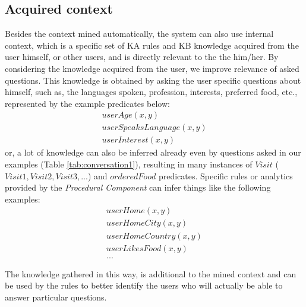 \subsection{Acquired context}
\label{section:acquiredContext}
Besides the context mined automatically, the system can also use internal 
context, which is a specific set of KA rules and KB knowledge acquired from
the user himself, or other users, and is directly relevant to the the him/her. 
By considering the knowledge acquired from the user, we improve relevance of 
asked questions. 
This knowledge is obtained by asking the user specific questions about himself,
such as, the languages spoken, profession, interests, preferred food, etc.,
represented by the example predicates below:
\begin{equation*}
\begin{gathered}
	userAge(x,y) \\	
	userSpeaksLanguage(x,y) \\
	userInterest(x,y)
\end{gathered}
\end{equation*}
or, a lot of knowledge can also be inferred already even by questions asked
in our examples (Table \ref{tab:conversation1}), resulting in many instances of
$Visit$ ($Visit1,Visit2,Visit3,...$) and $orderedFood$ predicates.
Specific rules or analytics provided by the \emph{Procedural Component} can
infer things like the following examples:
\begin{equation*}
\begin{gathered}
	userHome(x,y) \\
	userHomeCity(x,y) \\
	userHomeCountry(x,y) \\
	userLikesFood(x,y) \\
	...
\end{gathered}
\end{equation*}

The knowledge gathered in this way, is additional to the mined context and can 
be used by the rules to better identify the users who will actually be able to 
answer particular questions.

